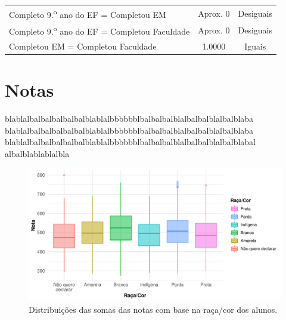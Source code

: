 \begin{table}[htb]
\begin{tabular}{lcc}
    Completo 9.\textsuperscript{o} ano do EF = Completou EM & Aprox. 0 & Desiguais\\
    Completo 9.\textsuperscript{o} ano do EF = Completou Faculdade & Aprox. 0 & Desiguais\\
    Completou EM = Completou Faculdade & 1.0000 & Iguais\\
    \bottomrule
    \end{tabular}
    \centering
    
\end{table}




\newpage
\section{Notas}

blablalbalbalbalbalbalblablalbbbbbblbalbalbalblalbalbalblalbalblaba
blablalbalbalbalbalbalblablalbbbbbblbalbalbalblalbalbalblalbalblaba
blablalbalbalbalbalbalblablalbbbbbblbalbalbalblalbalbalblalbalblabal
albalblablablalbla

\newpage
\begin{figure}[h]
    \caption{Distribuições das somas das notas com base na raça/cor dos alunos.}
    \begin{center}
        \includegraphics[width=16cm]{img/raca_cor_notas.pdf}
    \end{center}
\end{figure}


